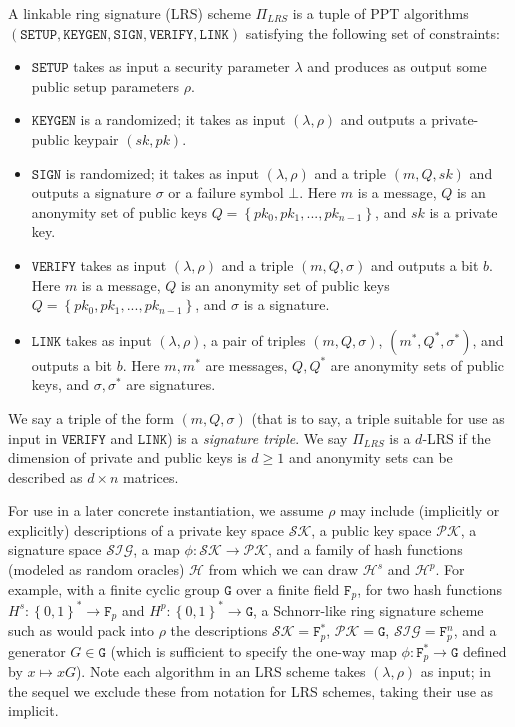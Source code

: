 \documentclass{llncs}
\newcommand{\F}{\texttt{F}_p}
\newcommand{\G}{\texttt{G}}
\newcommand{\Hp}{\mathcal{H}^p}
\newcommand{\Hs}{\mathcal{H}^s}
\begin{document}
\begin{definition}\label{def:lrs} A linkable ring signature (LRS) scheme $\Pi_{LRS}$ is a tuple of PPT algorithms $(\texttt{SETUP}, \texttt{KEYGEN}, \texttt{SIGN}, \texttt{VERIFY}, \texttt{LINK})$ satisfying the following set of constraints:
\begin{itemize}
\item $\texttt{SETUP}$ takes as input a security parameter $\lambda$ and produces as output some public setup parameters $\rho$.

\item $\texttt{KEYGEN}$ is a randomized; it takes as input $(\lambda, \rho)$ and outputs a private-public keypair $(sk, pk)$.

\item $\texttt{SIGN}$ is randomized; it takes as input $(\lambda, \rho)$ and a triple $(m, Q, sk)$ and outputs a signature $\sigma$ or a failure symbol $\bot$. Here $m$ is a message, $Q$ is an anonymity set of public keys $Q = \left\{pk_0, pk_1, ..., pk_{n-1}\right\}$, and $sk$ is a private key.

\item $\texttt{VERIFY}$ takes as input $(\lambda, \rho)$ and a triple $(m, Q, \sigma)$ and outputs a bit $b$. Here $m$ is a message, $Q$ is an anonymity set of public keys $Q = \left\{pk_0, pk_1, ..., pk_{n-1}\right\}$, and $\sigma$ is a signature.

\item $\texttt{LINK}$ takes as input $(\lambda, \rho)$, a pair of triples $(m, Q, \sigma)$, $(m^*, Q^*, \sigma^*)$, and outputs a bit $b$. Here $m, m^*$ are messages, $Q, Q^*$ are anonymity sets of public keys, and $\sigma, \sigma^*$ are signatures.
\end{itemize}
We say a triple of the form $(m, Q, \sigma)$ (that is to say, a triple suitable for use as input in $\texttt{VERIFY}$ and $\texttt{LINK}$) is a \textit{signature triple}. We say $\Pi_{LRS}$ is a $d$-LRS if the dimension of private and public keys is $d \geq 1$ and anonymity sets can be described as $d\times n$ matrices.
\end{definition}

For use in a later concrete instantiation, we assume $\rho$ may include (implicitly or explicitly) descriptions of a private key space $\mathcal{SK}$, a public key space $\mathcal{PK}$, a signature space $\mathcal{SIG}$, a map $\phi: \mathcal{SK} \to \mathcal{PK}$, and a family of hash functions (modeled as random oracles) $\mathcal{H}$ from which we can draw $\Hs$ and $\Hp$. For example, with a finite cyclic group $\G$ over a finite field $\F$, for two hash functions $H^s:\left\{0,1\right\}^* \to \F$ and $H^p:\left\{0,1\right\}^* \to \G$, a Schnorr-like ring signature scheme such as \cite{liu2004linkable} would pack into $\rho$ the descriptions $\mathcal{SK} = \F^*$, $\mathcal{PK} = \G$, $\mathcal{SIG} = \F^n$, and a generator $G \in \G$ (which is sufficient to specify the one-way map $\phi: \F^* \to \G$ defined by $x \mapsto xG$).  Note each algorithm in an LRS scheme takes $(\lambda, \rho)$ as input; in the sequel we exclude these from notation for LRS schemes, taking their use as implicit.
\end{document}

